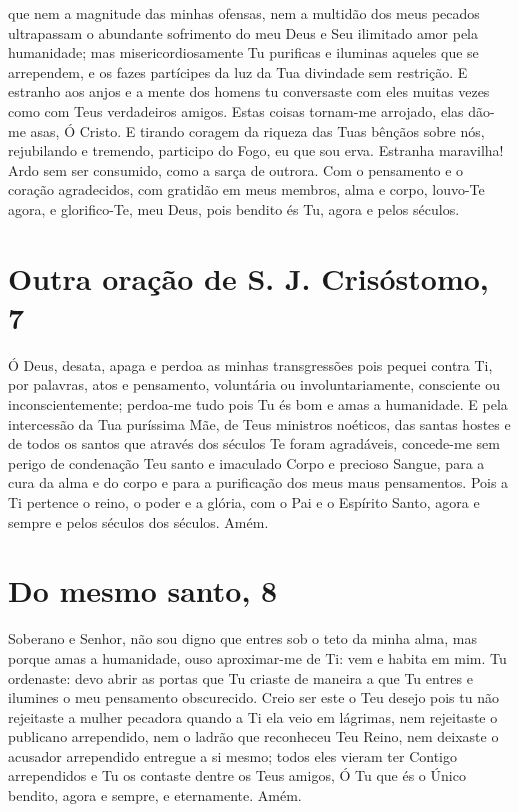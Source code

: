 \documentclass{subfiles}
\begin{document}
que nem a magnitude das minhas ofensas, nem a multidão dos meus pecados
ultrapassam o abundante sofrimento do meu Deus e Seu ilimitado amor pela
humanidade; mas misericordiosamente Tu purificas e iluminas aqueles que se
arrependem, e os fazes partícipes da luz da Tua divindade sem restrição. E
estranho aos anjos e a mente dos homens tu conversaste com eles muitas vezes
como com Teus verdadeiros amigos. Estas coisas tornam-me arrojado, elas dão-me
asas, Ó Cristo. E tirando coragem da riqueza das Tuas bênçãos sobre nós,
rejubilando e tremendo, participo do Fogo, eu que sou erva. Estranha maravilha!
Ardo sem ser consumido, como a sarça de outrora. Com o pensamento e o coração
agradecidos, com gratidão em meus membros, alma e corpo, louvo-Te agora, e
glorifico-Te, meu Deus, pois bendito és Tu, agora e pelos séculos.

\section*{Outra oração de S. J. Crisóstomo, 7}

Ó Deus, desata, apaga e perdoa as minhas transgressões pois pequei
contra Ti, por palavras, atos e pensamento, voluntária ou involuntariamente,
consciente ou inconscientemente; perdoa-me tudo pois Tu és bom e amas a
humanidade. E pela intercessão da Tua puríssima Mãe, de Teus ministros
noéticos, das santas hostes e de todos os santos que através dos séculos Te
foram agradáveis, concede-me sem perigo de condenação Teu santo e
imaculado Corpo e precioso Sangue, para a cura da alma e do corpo e para a
purificação dos meus maus pensamentos. Pois a Ti pertence o reino, o poder
e a glória, com o Pai e o Espírito Santo, agora e sempre e pelos séculos dos
séculos. Amém.

\section*{Do mesmo santo, 8}

Soberano e Senhor, não sou digno que entres sob o teto da minha alma, mas porque
amas a humanidade, ouso aproximar-me de Ti: vem e habita em mim. Tu ordenaste:
devo abrir as portas que Tu criaste de maneira a que Tu entres e ilumines o meu
pensamento obscurecido. Creio ser este o Teu desejo pois tu não rejeitaste a
mulher pecadora quando a Ti ela veio em lágrimas, nem rejeitaste o publicano
arrependido, nem o ladrão que reconheceu Teu Reino, nem deixaste o acusador
arrependido entregue a si mesmo; todos eles vieram ter Contigo arrependidos e Tu
os contaste dentre os Teus amigos, Ó Tu que és o Único bendito, agora e sempre,
e eternamente. Amém.
\end{document}

